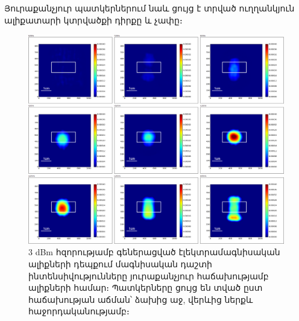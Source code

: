 \documentclass[12pt, fleqn]{report}
\begin{document}
Յուրաքանչյուր պատկերներում նաև ցույց է տրված ուղղանկյուն ալիքատարի կտրվածքի դիրքը և չափը։
\begin{figure}
    \begin{adjustwidth}{-1.5cm}{}
    \centering
     \includegraphics[width=1.0\textwidth]{data/experiment-results/free field of antenna, 6-14ghz, 3dbm generator output, distance 5mm.png}
    \caption{3 dBm հզորությամբ գեներացված էլեկտրամագնիսական ալիքների դեպքում մագնիսական դաշտի ինտենսիվությունները յուրաքանչյուր հաճախությամբ ալիքների համար։ Պատկերները ցույց են տված ըստ հաճախության աճման՝ ձախից աջ, վերևից ներքև հաջորդականությամբ։}
    \label{fig:3dBm-diagram}
\end{adjustwidth}
\end{figure}
\end{document}
